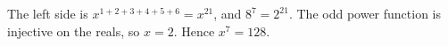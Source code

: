 The left side is $x^{1+2+3+4+5+6}=x^{21}$, and $8^7=2^{21}$. The odd power function is injective on the reals, so $x=2$. Hence $x^7=\boxed{128}$.
